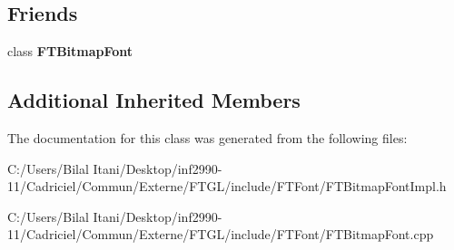 \subsection*{Friends}
\begin{DoxyCompactItemize}
\item 
class {\bfseries F\+T\+Bitmap\+Font}\hypertarget{class_f_t_bitmap_font_impl_a7ba5a198d501799828a37b4b808b9352}{}\label{class_f_t_bitmap_font_impl_a7ba5a198d501799828a37b4b808b9352}

\end{DoxyCompactItemize}
\subsection*{Additional Inherited Members}


The documentation for this class was generated from the following files\+:\begin{DoxyCompactItemize}
\item 
C\+:/\+Users/\+Bilal Itani/\+Desktop/inf2990-\/11/\+Cadriciel/\+Commun/\+Externe/\+F\+T\+G\+L/include/\+F\+T\+Font/F\+T\+Bitmap\+Font\+Impl.\+h\item 
C\+:/\+Users/\+Bilal Itani/\+Desktop/inf2990-\/11/\+Cadriciel/\+Commun/\+Externe/\+F\+T\+G\+L/include/\+F\+T\+Font/F\+T\+Bitmap\+Font.\+cpp\end{DoxyCompactItemize}
